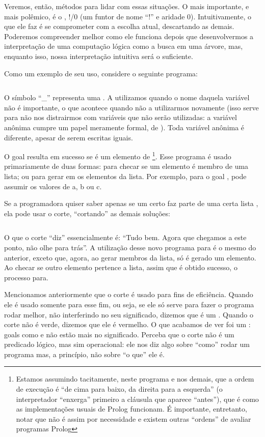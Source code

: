 \documentclass{article}
\begin{document}
Veremos, então, métodos para lidar com essas situações. O mais importante, e mais polêmico, é o , !/0 (um funtor de nome ``!'' e aridade 0). Intuitivamente, o que ele faz é se comprometer com a escolha atual, descartando as demais. Poderemos compreender melhor como ele funciona depois que desenvolvermos a interpretação de uma computação lógica como a busca em uma árvore, mas, enquanto isso, nossa interpretação intuitiva será o suficiente.

Como um exemplo de seu uso, considere o seguinte programa:

\inputminted{prolog}{../Exemplos/Cap4/prog1_member.pl}

O símbolo ``\_'' representa uma . A utilizamos quando o nome daquela variável não é importante, o que acontece quando não a utilizarmos novamente (isso serve para não nos distrairmos com variáveis que não serão utilizadas: a variável anônima cumpre um papel meramente formal, de ). Toda variável anônima é diferente, apesar de serem
escritas iguais.

O goal  resulta em sucesso se  é um elemento de
\footnote{Estamos assumindo tacitamente, neste programa e nos demais, que a ordem de execução é ``de cima para baixo, da direita para a esquerda'' (o interpretador ``enxerga'' primeiro a cláusula que aparece ``antes''), que é como as implementações usuais de Prolog funcionam. É importante, entretanto, notar que não é assim por necessidade e existem outras ``ordens'' de avaliar programas Prolog}. Esse programa é usado primariamente de duas formas: para checar se um elemento é membro de
uma lista; ou para gerar em  os elementos da lista. Por exemplo, para o goal ,  pode assumir os valores de a, b ou c.

Se a programadora quiser saber apenas se um certo  faz parte de uma certa lista , ela pode usar o corte, ``cortando'' as demais soluções:

\inputminted{prolog}{../Exemplos/Cap4/prog2_member2.pl}

O que o corte ``diz'' essencialmente é: ``Tudo bem. Agora que chegamos a este ponto, não olhe para trás''. A utilização desse novo programa para  é o mesmo do anterior, exceto que, agora, ao gerar membros da lista, só é gerado um elemento. Ao checar se outro elemento pertence a lista, assim que é obtido sucesso, o processo para.

Mencionamos anteriormente que o corte é usado para fins de eficiência. Quando ele é usado somente para esse fim, ou seja, se ele só serve para fazer o programa rodar melhor, não interferindo no seu significado, dizemos que é um .
Quando o corte não é verde, dizemos que ele é vermelho. O que acabamos de ver foi um : goals como  e  não estão mais no significado. Perceba que o corte não é um predicado lógico, mas sim operacional: ele nos diz algo sobre ``como'' rodar um programa mas, a princípio, não sobre ``o que'' ele é.
\end{document}
